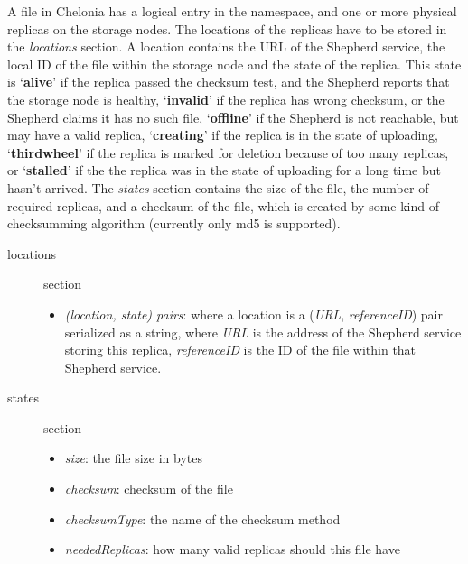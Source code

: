 \documentclass{book}
\begin{document}
A file in Chelonia has a logical entry in the namespace, and one or more physical replicas on the storage nodes. The locations of the replicas have to be stored in the \emph{locations} section. A location contains the URL of the Shepherd service, the local ID of the file within the storage node and the state of the replica. This state is `\textbf{alive}' if the replica passed the checksum test, and the Shepherd reports that the storage node is healthy, `\textbf{invalid}' if the replica has wrong checksum, or the Shepherd claims it has no such file, `\textbf{offline}' if the Shepherd is not reachable, but may have a valid replica, `\textbf{creating}' if the replica is in the state of uploading, `\textbf{thirdwheel}' if the replica is marked for deletion because of too many replicas, or `\textbf{stalled}' if the the replica was in the state of uploading for a long time but hasn't arrived. The \emph{states} section contains the size of the file, the number of required replicas, and a checksum of the file, which is created by some kind of checksumming algorithm (currently only md5 is supported).

\begin{description}
    \item [locations] section 
    \begin{itemize}
        \item \emph{(location, state) pairs}: where a location is a (\emph{URL}, \emph{referenceID}) pair serialized as a string, where \emph{URL} is the address of the Shepherd service storing this replica, \emph{referenceID} is the ID of the file within that Shepherd service.
    \end{itemize}
    \item [states] section 
    \begin{itemize}
        \item \emph{size}: the file size in bytes
        \item \emph{checksum}: checksum of the file
        \item \emph{checksumType}: the name of the checksum method
        \item \emph{neededReplicas}: how many valid replicas should this file have 
    \end{itemize}
\end{description}




\end{document}
